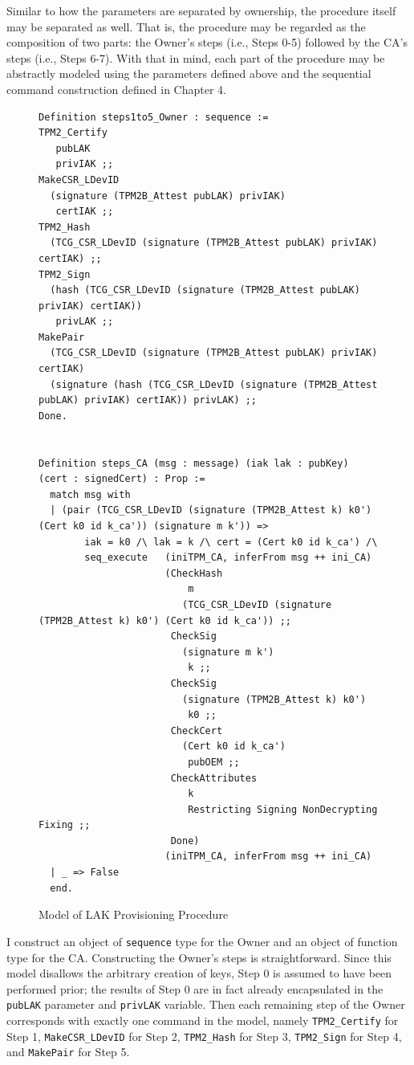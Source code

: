 \documentclass[runningheads]{llncs}
\begin{document}
 Similar to how the parameters are separated by ownership, the procedure itself may be separated as well. That is, the procedure may be regarded as the composition of two parts: the Owner's steps (i.e., Steps 0-5) followed by the CA's steps (i.e., Steps 6-7).
 With that in mind, each part of the procedure may be abstractly modeled using the parameters defined above and the sequential command construction defined in Chapter 4. 
\begin{figure}[h!]
\begin{lstlisting}[language=Coq]
Definition steps1to5_Owner : sequence :=
TPM2_Certify 
   pubLAK 
   privIAK ;;
MakeCSR_LDevID 
  (signature (TPM2B_Attest pubLAK) privIAK) 
   certIAK ;;
TPM2_Hash 
  (TCG_CSR_LDevID (signature (TPM2B_Attest pubLAK) privIAK) certIAK) ;;
TPM2_Sign 
  (hash (TCG_CSR_LDevID (signature (TPM2B_Attest pubLAK) privIAK) certIAK)) 
   privLAK ;;
MakePair 
  (TCG_CSR_LDevID (signature (TPM2B_Attest pubLAK) privIAK) certIAK) 
  (signature (hash (TCG_CSR_LDevID (signature (TPM2B_Attest pubLAK) privIAK) certIAK)) privLAK) ;;
Done. 


Definition steps_CA (msg : message) (iak lak : pubKey) (cert : signedCert) : Prop :=
  match msg with
  | (pair (TCG_CSR_LDevID (signature (TPM2B_Attest k) k0') (Cert k0 id k_ca')) (signature m k')) =>
        iak = k0 /\ lak = k /\ cert = (Cert k0 id k_ca') /\
        seq_execute   (iniTPM_CA, inferFrom msg ++ ini_CA)
                      (CheckHash 
                          m
                         (TCG_CSR_LDevID (signature (TPM2B_Attest k) k0') (Cert k0 id k_ca')) ;;
                       CheckSig
                         (signature m k') 
                          k ;;
                       CheckSig 
                         (signature (TPM2B_Attest k) k0') 
                          k0 ;;
                       CheckCert 
                         (Cert k0 id k_ca') 
                          pubOEM ;;
                       CheckAttributes 
                          k 
                          Restricting Signing NonDecrypting Fixing ;;
                       Done)
                      (iniTPM_CA, inferFrom msg ++ ini_CA)
  | _ => False
  end.
\end{lstlisting}
\caption{Model of LAK Provisioning Procedure}
\label{fig:lak_model}
\end{figure}
I construct an object of \verb|sequence| type for the Owner and an object of function type for the CA. Constructing the Owner's steps is straightforward. Since this model disallows the arbitrary creation of keys, Step 0 is assumed to have been performed prior; the results of Step 0 are in fact already encapsulated in the \verb|pubLAK| parameter and \verb|privLAK| variable. Then each remaining step of the Owner corresponds with exactly one command in the model, namely \verb|TPM2_Certify| for Step 1, \verb|MakeCSR_LDevID| for Step 2, \verb|TPM2_Hash| for Step 3, \verb|TPM2_Sign| for Step 4, and \verb|MakePair| for Step 5. 
\end{document}

